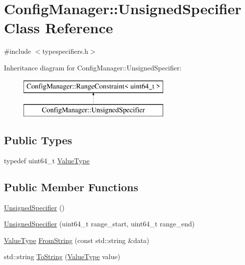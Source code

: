 \hypertarget{class_config_manager_1_1_unsigned_specifier}{}\section{Config\+Manager\+:\+:Unsigned\+Specifier Class Reference}
\label{class_config_manager_1_1_unsigned_specifier}


{\ttfamily \#include $<$typespecifiers.\+h$>$}

Inheritance diagram for Config\+Manager\+:\+:Unsigned\+Specifier\+:\begin{figure}[H]
\begin{center}
\leavevmode
\includegraphics[height=2.000000cm]{class_config_manager_1_1_unsigned_specifier}
\end{center}
\end{figure}
\subsection*{Public Types}
\begin{DoxyCompactItemize}
\item 
typedef uint64\+\_\+t \hyperlink{class_config_manager_1_1_unsigned_specifier_aeaec69406d5a86486cb880750c3781e2}{Value\+Type}
\end{DoxyCompactItemize}
\subsection*{Public Member Functions}
\begin{DoxyCompactItemize}
\item 
\hyperlink{class_config_manager_1_1_unsigned_specifier_a123ab9e22e0757e91505222ca792ab56}{Unsigned\+Specifier} ()
\item 
\hyperlink{class_config_manager_1_1_unsigned_specifier_afb1ea2b4ea04fa083b22fc4ebdd763df}{Unsigned\+Specifier} (uint64\+\_\+t range\+\_\+start, uint64\+\_\+t range\+\_\+end)
\item 
\hyperlink{class_config_manager_1_1_unsigned_specifier_aeaec69406d5a86486cb880750c3781e2}{Value\+Type} \hyperlink{class_config_manager_1_1_unsigned_specifier_af4a11ae27e6ce3b4ab52995a48d37e9d}{From\+String} (const std\+::string \&data)
\item 
std\+::string \hyperlink{class_config_manager_1_1_unsigned_specifier_a10c19038f3a0fe8714dd689ab597e7d8}{To\+String} (\hyperlink{class_config_manager_1_1_unsigned_specifier_aeaec69406d5a86486cb880750c3781e2}{Value\+Type} value)
\end{DoxyCompactItemize}


